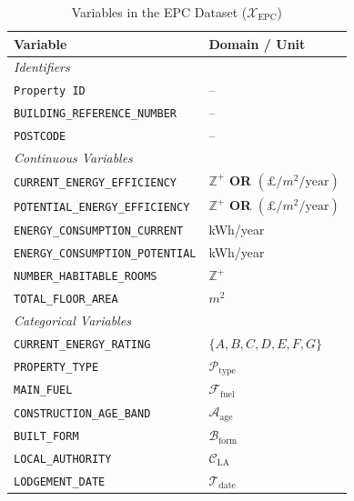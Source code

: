 \documentclass[12pt]{article}
\begin{document}
\iffalse
\begin{table}[!htbp]
\centering
\caption{Variables in the EPC Dataset ($\mathcal{X}_{\text{EPC}}$)}
\label{tab:epc_variables}
\renewcommand{\arraystretch}{1.2}
\begin{tabular}{@{} p{} p{} @{}}
\toprule
\textbf{Variable} & \textbf{Domain / Unit} \\
\midrule
\multicolumn{2}{l}{\textit{Identifiers}} \\
\midrule
\texttt{Property ID} & -- \\
\texttt{BUILDING\_REFERENCE\_NUMBER} & -- \\
\texttt{POSTCODE} & -- \\

\midrule
\multicolumn{2}{l}{\textit{Continuous Variables}} \\
\midrule
\texttt{CURRENT\_ENERGY\_EFFICIENCY} & $\mathbb{Z}^+$ \textbf{OR} $(\text{£}/m^2/\text{year})$ \\
\texttt{POTENTIAL\_ENERGY\_EFFICIENCY} & $\mathbb{Z}^+$ \textbf{OR} $(\text{£}/m^2/\text{year})$ \\
\texttt{ENERGY\_CONSUMPTION\_CURRENT} & kWh/year \\
\texttt{ENERGY\_CONSUMPTION\_POTENTIAL} & kWh/year \\
\texttt{NUMBER\_HABITABLE\_ROOMS} & $\mathbb{Z}^+$ \\
\texttt{TOTAL\_FLOOR\_AREA} & $m^2$ \\

\midrule
\multicolumn{2}{l}{\textit{Categorical Variables}} \\
\midrule
\texttt{CURRENT\_ENERGY\_RATING} & $\{A, B, C, D, E, F, G\}$ \\
\texttt{PROPERTY\_TYPE} & $\mathcal{P}_{\text{type}}$ \\
\texttt{MAIN\_FUEL} & $\mathcal{F}_{\text{fuel}}$ \\
\texttt{CONSTRUCTION\_AGE\_BAND} & $\mathcal{A}_{\text{age}}$ \\
\texttt{BUILT\_FORM} & $\mathcal{B}_{\text{form}}$ \\
\texttt{LOCAL\_AUTHORITY} & $\mathcal{C}_{\text{LA}}$ \\
\texttt{LODGEMENT\_DATE} & $\mathcal{T}_{\text{date}}$ \\
\bottomrule
\end{tabular}
\end{table}
\end{document}
